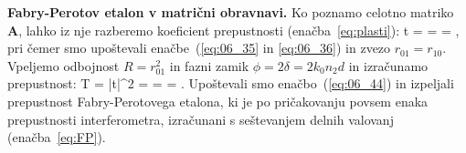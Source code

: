 \begin{example}{\bf Fabry-Perotov etalon v matrični obravnavi.}
Ko poznamo celotno matriko $\mathbf{A}$, lahko iz nje razberemo koeficient prepustnosti 
(enačba~\ref{eq:plasti}):
\beq
t =  =  = 
,
\label{eq:06_68}
\eeq
pri čemer smo upoštevali enačbe~(\ref{eq:06_35} in \ref{eq:06_36}) in zvezo
$r_{01} = r_{10}$. Vpeljemo odbojnost $R = r_{01}^2$ in fazni zamik 
$\phi = 2 \delta = 2 k_0 n_2 d$ in izračunamo prepustnost:
\beq
T = |t|^2 =  = =
.
\label{eq:06_69}
\eeq
Upoštevali smo enačbo~(\ref{eq:06_44}) in izpeljali prepustnost 
Fabry-Perotovega etalona, ki je po pričakovanju povsem enaka prepustnosti interferometra, 
izračunani s seštevanjem delnih valovanj (enačba~\ref{eq:FP}).

\end{example}

